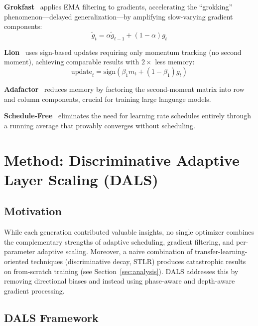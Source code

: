 \documentclass[a4paper,fleqn]{cas-dc}
\begin{document}
\textbf{Grokfast}~\citet{chen2024grokfast} applies EMA filtering to gradients, accelerating the ``grokking'' phenomenon---delayed generalization---by amplifying slow-varying gradient components:
\begin{equation}\label{eq:grokfast}
\tilde{g}_t = \alpha \tilde{g}_{t-1} + (1-\alpha) g_t
\end{equation}

\textbf{Lion}~\citet{chen2023symbolic} uses sign-based updates requiring only momentum tracking (no second moment), achieving comparable results with $2\times$ less memory:
\begin{equation}\label{eq:lion}
\text{update}_t = \text{sign}(\beta_1 m_t + (1-\beta_1) g_t)
\end{equation}

\textbf{Adafactor}~\citet{shazeer2018adafactor} reduces memory by factoring the second-moment matrix into row and column components, crucial for training large language models.

\textbf{Schedule-Free}~\citet{defazio2024schedulefree} eliminates the need for learning rate schedules entirely through a running average that provably converges without scheduling.

\section{Method: Discriminative Adaptive Layer Scaling (DALS)}\label{sec:method}

\subsection{Motivation}

While each generation contributed valuable insights, no single optimizer combines the complementary strengths of adaptive scheduling, gradient filtering, and per-parameter adaptive scaling. Moreover, a naive combination of transfer-learning-oriented techniques (discriminative decay, STLR) produces catastrophic results on from-scratch training (see Section~\ref{sec:analysis}). DALS addresses this by removing directional biases and instead using phase-aware and depth-aware gradient processing.

\subsection{DALS Framework}
\end{document}
